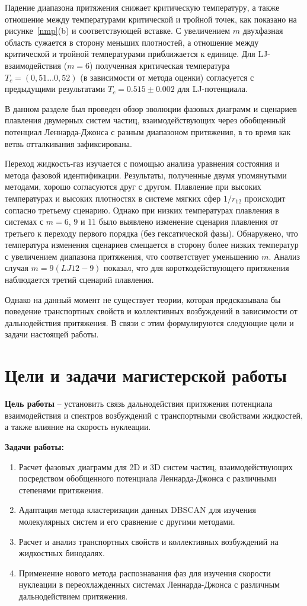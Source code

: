 Падение диапазона притяжения снижает критическую температуру, а также отношение между температурами критической и тройной точек, как показано на рисунке~\ref{nmp}(b) и соответствующей вставке.
С увеличением $m$ двухфазная область сужается в сторону меньших плотностей, а отношение между критической и тройной температурами приближается к единице.
Для LJ-взаимодействия ($m = 6$) полученная критическая температура $T_c=(0,51 . . . 0,52)$ (в зависимости от метода оценки) согласуется с предыдущими результатами $T_c = 0.515 \pm 0.002$  для LJ-потенциала.

В данном разделе был проведен обзор эволюции фазовых диаграмм и сценариев плавления двумерных систем частиц, взаимодействующих через обобщенный потенциал Леннарда-Джонса с разным диапазоном притяжения, в то время как ветвь отталкивания зафиксирована.

Переход жидкость-газ изучается с помощью анализа уравнения состояния и метода фазовой идентификации.
Результаты, полученные двумя упомянутыми методами, хорошо согласуются друг с другом.
Плавление при высоких температурах и высоких плотностях в системе мягких сфер $1/r_{12}$ происходит согласно третьему сценарию. 
Однако при низких температурах плавления в системах с $m = 6$, $9$ и $11$ было выявлено изменение сценария плавления от третьего к переходу первого порядка (без гексатической фазы).
Обнаружено, что температура изменения сценариев смещается в сторону более низких температур с увеличением диапазона притяжения, что соответствует уменьшению $m$. 
Анализ случая $m = 9 (LJ12-9)$  показал, что для короткодействующего притяжения наблюдается третий сценарий плавления.

Однако на данный момент не существует теории, которая предсказывала бы поведение транспортных свойств и коллективных возбуждений в зависимости от дальнодействия притяжения.
В связи с этим формулируются следующие цели и задачи настоящей работы.

\section{Цели и задачи магистерской работы}

\textbf{Цель работы} -- установить связь дальнодействия притяжения потенциала взаимодействия и спектров возбуждений с транспортными свойствами жидкостей, а также влияние на скорость нуклеации.

\textbf{Задачи работы:}
\begin{enumerate}
	\item Расчет фазовых диаграмм для 2D и 3D систем частиц, взаимодействующих посредством обобщенного потенциала Леннарда-Джонса с различными степенями притяжения.
	\item Адаптация метода кластеризации данных DBSCAN для изучения молекулярных систем и его сравнение с другими методами.
	\item Расчет и анализ транспортных свойств и коллективных возбуждений на жидкостных бинодалях.
	\item Применение нового метода распознавания фаз для изучения скорости нуклеации в переохлажденных системах Леннарда-Джонса с различным дальнодействием притяжения.
\end{enumerate}